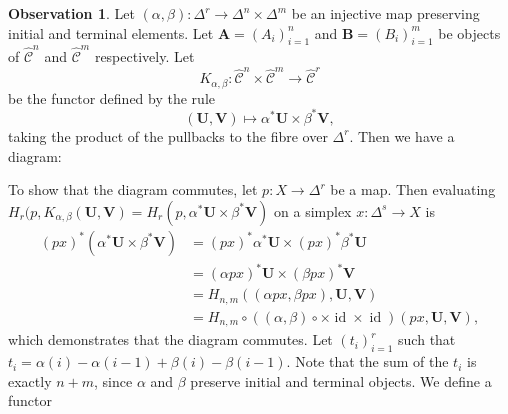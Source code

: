 \documentclass[a4paper]{article}
\numberwithin{equation}{subsection}
\theoremstyle{plain}   %
\theoremstyle{definition}
\newtheorem{obs}[equation]{Observation}
\theoremstyle{remark}
\theoremstyle{plain}
\DeclareMathOperator{\id}{id}
\newcommand{\overcat}[2]{{\left(#1\downarrow #2\right)}}
\newcommand{\psh}[1]{\ensuremath{\widehat{#1}}}
\providecommand{\C}{}
\renewcommand{\C}{\ensuremath{\mathcal{C}}}
\newcommand{\ssetlab}{\ensuremath{\widehat{\Delta} \int \widehat{\mathcal{C}}}}
\begin{document}
\begin{obs}\label{square2}
	Let \((\alpha, \beta): \Delta^r \to \Delta^n\times \Delta^m\) be an injective map preserving initial and terminal elements.  Let \(\mathbf{A}=(A_i)^n_{i=1}\) and \(\mathbf{B}=(B_i)^m_{i=1}\) be objects of \(\psh{\C}^n\) and \(\psh{\C}^m\) respectively.  Let 
	\[K_{\alpha,\beta}:\psh{\C}^n \times \psh{\C}^m\to \psh{\C}^r\] be the functor defined by the rule
	\[(\mathbf{U},\mathbf{V})\mapsto \alpha^\ast \mathbf{U} \times \beta^\ast \mathbf{V},\]
	taking the product of the pullbacks to the fibre over \(\Delta^r\).  Then we have a diagram:
	\begin{center}
	\end{center}
	To show that the diagram commutes, let \(p:X\to \Delta^r\) be a map.  Then evaluating \(H_r(p,K_{\alpha,\beta}(\mathbf{U},\mathbf{V})=H_r(p,\alpha^*\mathbf{U} \times \beta^*\mathbf{V})\) on a simplex \(x:\Delta^s\to X\) is 
	\begin{align*}
		(px)^\ast(\alpha^\ast\mathbf{U} \times \beta^\ast\mathbf{V}) &= (px)^\ast\alpha^\ast\mathbf{U} \times (px)^\ast\beta^\ast\mathbf{U}\\
		&=(\alpha px)^\ast\mathbf{U} \times (\beta px)^\ast\mathbf{V}\\
		&=H_{n,m}((\alpha px, \beta px),\mathbf{U},\mathbf{V})\\
		&=H_{n,m}\circ ((\alpha,\beta)\circ \times \id \times \id) (px,\mathbf{U},\mathbf{V}), 
	\end{align*}
	which demonstrates that the diagram commutes.
	Let \((t_i)_{i=1}^r\) such that \(t_i=\alpha(i)-\alpha(i-1) +\beta(i) - \beta(i-1)\).  Note that the sum of the \(t_i\) is exactly \(n+m\), since \(\alpha\) and \(\beta\) preserve initial and terminal objects.  We define a functor 

\end{obs}
\end{document}
